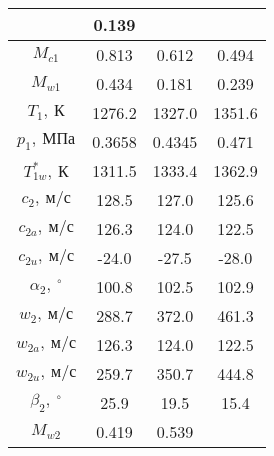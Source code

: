\documentclass[a4paper,10pt]{article}
\begin{document}
\begin{longtable}{
    |
%    
    c|
%    
    c|
%    
    c|
%    
    c|
%    
    }
%        
        & 0.139
%        
        \\
        \hline
%        
        $M_{c1}$
%        
        & 0.813
%        
        & 0.612
%        
        & 0.494
%        
        \\
        \hline
%        
        $M_{w1}$
%        
        & 0.434
%        
        & 0.181
%        
        & 0.239
%        
        \\
        \hline
%        
        $T_1,\ К$
%        
        & 1276.2
%        
        & 1327.0
%        
        & 1351.6
%        
        \\
        \hline
%        
        $p_1,\ МПа$
%        
        & 0.3658
%        
        & 0.4345
%        
        & 0.471
%        
        \\
        \hline
%        
        $T_{1w}^*,\ К$
%        
        & 1311.5
%        
        & 1333.4
%        
        & 1362.9
%        
        \\
        \hline
%        
        $c_2,\ м/с$
%        
        & 128.5
%        
        & 127.0
%        
        & 125.6
%        
        \\
        \hline
%        
        $c_{2a},\ м/с$
%        
        & 126.3
%        
        & 124.0
%        
        & 122.5
%        
        \\
        \hline
%        
        $c_{2u},\ м/с$
%        
        & -24.0
%        
        & -27.5
%        
        & -28.0
%        
        \\
        \hline
%        
        $\alpha_2,\ ^\circ$
%        
        & 100.8
%        
        & 102.5
%        
        & 102.9
%        
        \\
        \hline
%        
        $w_2,\ м/с$
%        
        & 288.7
%        
        & 372.0
%        
        & 461.3
%        
        \\
        \hline
%        
        $w_{2a},\ м/с$
%        
        & 126.3
%        
        & 124.0
%        
        & 122.5
%        
        \\
        \hline
%        
        $w_{2u},\ м/с$
%        
        & 259.7
%        
        & 350.7
%        
        & 444.8
%        
        \\
        \hline
%        
        $\beta_2,\ ^\circ$
%        
        & 25.9
%        
        & 19.5
%        
        & 15.4
%        
        \\
        \hline
%        
        $M_{w2}$
%        
        & 0.419
%        
        & 0.539

\end{longtable}
\end{document}
